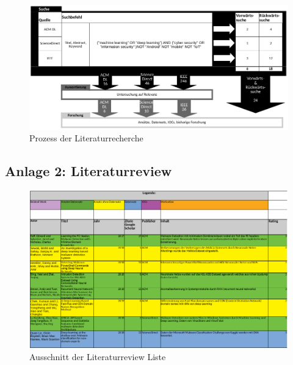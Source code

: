 \documentclass[
    12pt, %
    DIV10,
    ngerman, %
    a4paper, %
    oneside, %
    titlepage, %
    parskip=half, %
    headings=normal, %
    listof=totoc, %
    bibliography=totoc, %
    index=totoc, %
    captions=tableheading, %
    final %
]{scrreprt}
\begin{document}
\begin{figure}[h!]
\hspace{-2.3cm}
\includegraphics[width=1.3\textwidth]{img/rm}
\caption*{Prozess der Literaturrecherche}
\end{figure}
\newpage
\subsection*{Anlage 2: Literaturreview}\label{literaturr}

\begin{figure}[h!]
\hspace{-2.2cm}
\includegraphics[width=1.3\textwidth]{img/literaturr}
\caption*{Ausschnitt der Literaturreview Liste}
\end{figure}
\listoftodos
\end{document}
